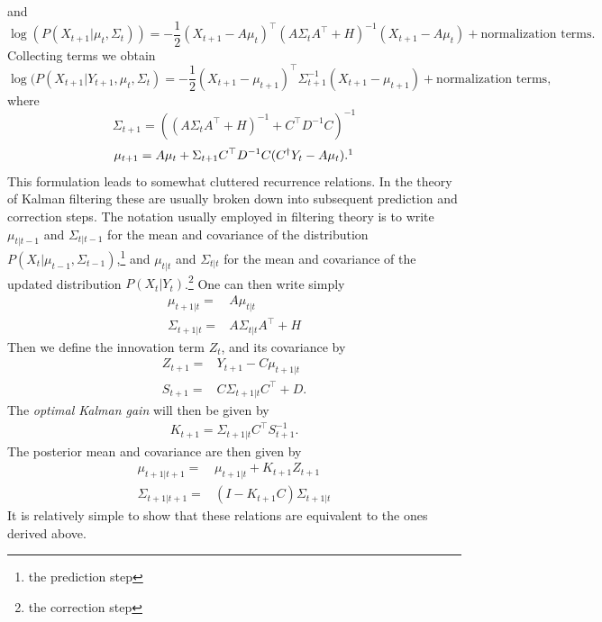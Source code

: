 and
\[
\log( P(X_{t+1}|\mu_t,\Sigma_t))= -\frac{1}{2}(X_{t+1} - A \mu_t)^\top (A\Sigma_tA^\top + H)^{-1} (X_{t+1} - A\mu_t) +\textrm{normalization terms}.
\]
Collecting terms we obtain
\[
\log( P(X_{t+1}|Y_{t+1},\mu_t,\Sigma_t) = -\frac{1}{2}( X_{t+1} - \mu_{t+1})^\top \Sigma_{t+1}^{-1} (X_{t+1}-\mu_{t+1}) + \textrm{normalization terms},
\]
where
\[
\Sigma_{t+1} = \left(\left(A\Sigma_tA^\top+H\right)^{-1} + C^\top D^{-1}C \right)^{-1}
\]
\[
\mu_{t+1} = A\mu_t + \Sigma_{t+1} C^\top D^{-1} C ( C^\dagger Y_t - A\mu_t).\footnotemark
\]
This formulation leads to somewhat cluttered recurrence relations. In the theory of Kalman filtering these are usually broken down into subsequent prediction and correction steps. The notation usually employed in filtering theory is to write $\mu_{t|t-1}$ and $\Sigma_{t|t-1}$ for the mean and covariance of the distribution $P(X_t|\mu_{t-1},\Sigma_{t-1})$,\footnote{the prediction step} and $\mu_{t|t}$ and $\Sigma_{t|t}$ for the mean and covariance of the updated distribution $P(X_t|Y_t)$.\footnote{the correction step} One can then write simply
\begin{eqnarray*}
\mu_{t+1|t} = &A\mu_{t|t}\\
\Sigma_{t+1|t} = & A\Sigma_{t|t}A^\top + H
\end{eqnarray*}
Then we define the innovation term $Z_t$, and its covariance by
\begin{eqnarray*}
Z_{t+1} = & Y_{t+1} - C \mu_{t+1|t}\\
S_{t+1} = & C\Sigma_{t+1|t}C^\top + D.
\end{eqnarray*}
The \emph{optimal Kalman gain} will then be given by
\begin{eqnarray*}
K_{t+1} = \Sigma_{t+1|t} C^\top S_{t+1}^{-1}.
\end{eqnarray*}
The posterior mean and covariance are then given by
\begin{eqnarray*}
\mu_{t+1|t+1} =& \mu_{t+1|t} + K_{t+1} Z_{t+1}\\
\Sigma_{t+1|t+1} =& \left(I-K_{t+1} C\right) \Sigma_{t+1|t}
\end{eqnarray*}
It is relatively simple to show that these relations are equivalent to the ones derived above.\par
